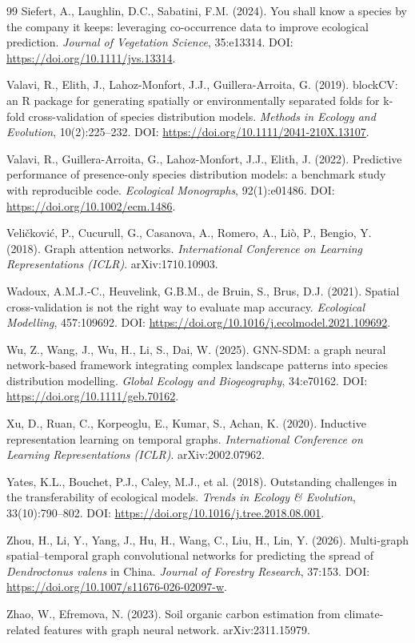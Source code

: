 \documentclass[a4paper,fleqn]{cas-sc}
\begin{document}
\begin{thebibliography}{99}
 Siefert, A., Laughlin, D.C., Sabatini, F.M. (2024). You shall know a species by the company it keeps: leveraging co-occurrence data to improve ecological prediction. \textit{Journal of Vegetation Science}, 35:e13314. DOI: \url{https://doi.org/10.1111/jvs.13314}.

 Valavi, R., Elith, J., Lahoz-Monfort, J.J., Guillera-Arroita, G. (2019). blockCV: an R package for generating spatially or environmentally separated folds for k-fold cross-validation of species distribution models. \textit{Methods in Ecology and Evolution}, 10(2):225--232. DOI: \url{https://doi.org/10.1111/2041-210X.13107}.

 Valavi, R., Guillera-Arroita, G., Lahoz-Monfort, J.J., Elith, J. (2022). Predictive performance of presence-only species distribution models: a benchmark study with reproducible code. \textit{Ecological Monographs}, 92(1):e01486. DOI: \url{https://doi.org/10.1002/ecm.1486}.

 Veli\v{c}kovi\'c, P., Cucurull, G., Casanova, A., Romero, A., Li\`o, P., Bengio, Y. (2018). Graph attention networks. \textit{International Conference on Learning Representations (ICLR)}. arXiv:1710.10903.

 Wadoux, A.M.J.-C., Heuvelink, G.B.M., de Bruin, S., Brus, D.J. (2021). Spatial cross-validation is not the right way to evaluate map accuracy. \textit{Ecological Modelling}, 457:109692. DOI: \url{https://doi.org/10.1016/j.ecolmodel.2021.109692}.

 Wu, Z., Wang, J., Wu, H., Li, S., Dai, W. (2025). GNN-SDM: a graph neural network-based framework integrating complex landscape patterns into species distribution modelling. \textit{Global Ecology and Biogeography}, 34:e70162. DOI: \url{https://doi.org/10.1111/geb.70162}.

 Xu, D., Ruan, C., Korpeoglu, E., Kumar, S., Achan, K. (2020). Inductive representation learning on temporal graphs. \textit{International Conference on Learning Representations (ICLR)}. arXiv:2002.07962.

 Yates, K.L., Bouchet, P.J., Caley, M.J., et al. (2018). Outstanding challenges in the transferability of ecological models. \textit{Trends in Ecology \& Evolution}, 33(10):790--802. DOI: \url{https://doi.org/10.1016/j.tree.2018.08.001}.

 Zhou, H., Li, Y., Yang, J., Hu, H., Wang, C., Liu, H., Lin, Y. (2026). Multi-graph spatial--temporal graph convolutional networks for predicting the spread of \textit{Dendroctonus valens} in China. \textit{Journal of Forestry Research}, 37:153. DOI: \url{https://doi.org/10.1007/s11676-026-02097-w}.

 Zhao, W., Efremova, N. (2023). Soil organic carbon estimation from climate-related features with graph neural network. arXiv:2311.15979.

\end{thebibliography}
\end{document}
